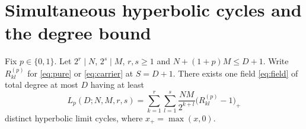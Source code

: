 \section{Simultaneous hyperbolic cycles and the degree bound}\label{sec:counts}

\begin{theorem}\label{th:finite}
Fix $p\in\{0,1\}$. Let $2^r\mid N$, $2^s\mid M$, $r,s\ge1$ and $N+(1+p)M\le D+1$. Write $R_{kl}^{(p)}$ for \eqref{eq:pure} or \eqref{eq:carrier} at $S=D+1$. There exists one field \eqref{eq:field} of total degree at most $D$ having at least
\begin{equation}\label{eq:gridcount}
 L_p(D;N,M,r,s)=\sum_{k=1}^r\sum_{l=1}^s
       \frac{NM}{2^{k+l}}\big(R_{kl}^{(p)}-1\big)_+
\end{equation}
distinct hyperbolic limit cycles, where $x_+=\max(x,0)$.
\end{theorem}
